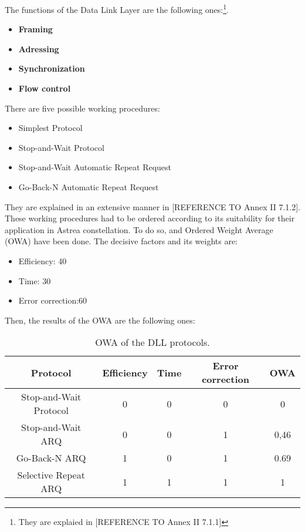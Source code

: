 %
The functions of the Data Link Layer are the following ones:\footnote{They are explaied in [REFERENCE TO Annex II 7.1.1]}.
\begin{itemize}
\item \textbf{Framing}
\item \textbf{Adressing}
\item \textbf{Synchronization}
\item \textbf{Flow control}
 \end{itemize}
There are five possible working procedures:
\begin{itemize}
\item Simplest Protocol
\item Stop-and-Wait Protocol
\item Stop-and-Wait Automatic Repeat Request
\item Go-Back-N Automatic Repeat Request
\end{itemize}
They are explained in an extensive manner in [REFERENCE TO Annex II 7.1.2]. These working procedures had to be ordered according to its suitability for their application in Astrea constellation. To do so, and Ordered Weight Average (OWA) have been done. The decisive factors and its weights are: 
\begin{itemize}
\item Efficiency: 40
\item Time: 30
\item Error correction:60
\end{itemize}
Then, the results of the OWA are the following ones:
\begin{table}[H]
\begin{center}
\begin{tabular}{ | c | c | c | c | c |}
\hline
Protocol&Efficiency&Time&Error correction&OWA\\
\hline
Stop-and-Wait Protocol&0&0&0&0\\
\hline
Stop-and-Wait ARQ&0&0&1&0,46\\
\hline
Go-Back-N ARQ&1&0&1&0.69\\
\hline
Selective Repeat ARQ&1&1&1&1\\
\hline
\end{tabular}
\caption{OWA of the DLL protocols.}
\end{center}
\end{table} 
